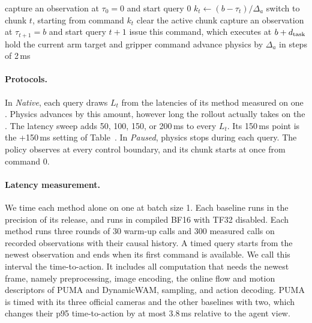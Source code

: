 \begin{algorithm}[t]
\caption{\textbf{Execution at native latency.} All methods share this executor. $L_t$ is drawn from the latencies measured for each method.}
\label{alg:executor}
\footnotesize
\begin{algorithmic}[1]
\State capture an observation at $\tau_0=0$ and start query 0
    \State $k_t\gets(b-\tau_t)/\Delta_a$
      \State switch to chunk $t$, starting from command $k_t$
    \Else
      \State clear the active chunk
    \EndIf
    \State capture an observation at $\tau_{t+1}=b$ and start query $t+1$
  \EndIf
    \State issue this command, which executes at $b+d_{\rm task}$
  \Else
    \State hold the current arm target and gripper command
  \EndIf
  \State advance physics by $\Delta_a$ in steps of 2\,ms
\EndFor
\end{algorithmic}
\end{algorithm}

\paragraph{Protocols.}
In \emph{Native}, each query draws $L_t$ from the latencies of its method measured on
one \cfgGPU{}. Physics advances by this amount, however long the rollout actually takes
on the \cfgEvalGPU{}. The latency sweep adds 50, 100, 150, or
200\,ms to every $L_t$. Its 150\,ms point is the +150\,ms setting of
Table~. In \emph{Paused}, physics stops during each query. The policy observes at every control boundary, and its chunk starts at once from command 0.

\paragraph{Latency measurement.}
\label{app:timing}
We time each method alone on one \cfgGPU{} at batch size 1. Each baseline runs in the
precision of its release, and \ours runs in compiled BF16 with TF32 disabled. Each
method runs three rounds of 30 warm-up calls and 300 measured calls on recorded observations with their causal history. A timed query starts from the newest
observation and ends when its first command is available. We call this interval the
time-to-action. It includes all computation that needs the newest frame, namely preprocessing, image encoding, the online flow
and motion descriptors of PUMA and DynamicWAM, sampling, and action decoding. PUMA is
timed with its three official cameras and the other baselines with two, which changes
their p95 time-to-action by at most 3.8\,ms relative to the agent view.

